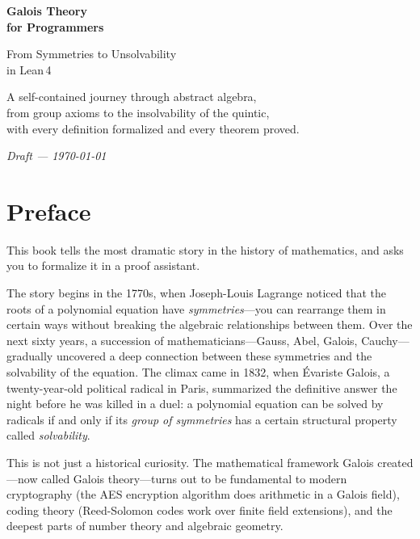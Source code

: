 \documentclass[11pt, a4paper, oneside]{book}
\begin{document}
\begin{titlepage}
\centering
\vspace*{3cm}
{\Huge\bfseries\color{deepblue} Galois Theory\\[0.3cm] for Programmers\par}
\vspace{1cm}
{\Large\color{midblue} From Symmetries to Unsolvability\\[0.2cm]
in Lean\,4\par}
\vspace{2cm}
{\large A self-contained journey through abstract algebra,\\
from group axioms to the insolvability of the quintic,\\
with every definition formalized and every theorem proved.\par}
\vspace{3cm}
{\large\itshape Draft --- \today\par}
\vfill
\end{titlepage}

\frontmatter
\tableofcontents

\chapter*{Preface}

This book tells the most dramatic story in the history of mathematics, and asks
you to formalize it in a proof assistant.

The story begins in the 1770s, when Joseph-Louis Lagrange noticed that the
roots of a polynomial equation have \emph{symmetries}---you can rearrange them
in certain ways without breaking the algebraic relationships between them. Over
the next sixty years, a succession of mathematicians---Gauss, Abel, Galois,
Cauchy---gradually uncovered a deep connection between these symmetries and the
solvability of the equation. The climax came in 1832, when Évariste Galois,
a twenty-year-old political radical in Paris, summarized the definitive answer
the night before he was killed in a duel: a polynomial equation can be solved
by radicals if and only if its \emph{group of symmetries} has a certain
structural property called \emph{solvability}.

This is not just a historical curiosity. The mathematical framework Galois
created---now called Galois theory---turns out to be fundamental to modern
cryptography (the AES encryption algorithm does arithmetic in a Galois field),
coding theory (Reed-Solomon codes work over finite field extensions), and the
deepest parts of number theory and algebraic geometry.
\end{document}
